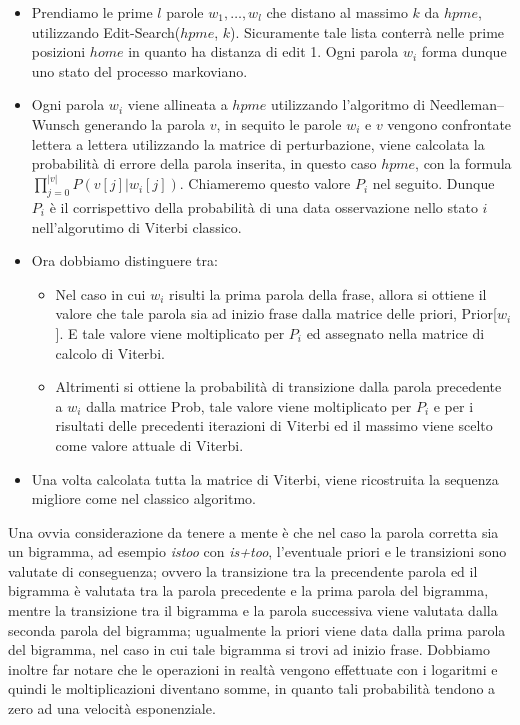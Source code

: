 \begin{itemize}
  \item Prendiamo le prime $l$ parole $w_1, \dots, w_l$ che distano al massimo $k$ da 
  $hpme$, utilizzando Edit-Search($hpme$, $k$). 
  Sicuramente tale lista conterr\`a nelle prime posizioni $home$ 
  in quanto ha distanza di edit 1. 
   Ogni parola $w_i$ forma dunque uno stato del processo markoviano.
  \item Ogni parola $w_i$ viene allineata a $hpme$ utilizzando 
  l'algoritmo di Needleman–Wunsch \cite{NEEDLEMAN1970443} generando
  la parola $v$, in sequito le parole $w_i$ e $v$ vengono confrontate
  lettera a lettera utilizzando la matrice di perturbazione, viene
  calcolata la probabilit\`a di errore della parola inserita, in 
  questo caso $hpme$, con la formula 
  $\prod_{j=0}^{|v|} P(v[j] \vert w_i[j])$. 
  Chiameremo questo valore $P_i$ nel seguito. 
  Dunque $P_i$ \`e il corrispettivo della probabilit\`a di una data
  osservazione nello stato $i$ nell'algorutimo di Viterbi classico.
  \item Ora dobbiamo distinguere tra:
  \begin{itemize}
    \item Nel caso in cui $w_i$ risulti la prima parola della frase,
    allora si ottiene il valore che tale parola sia ad inizio frase
    dalla matrice delle priori, Prior[$w_i$]. E tale valore viene
    moltiplicato per $P_i$ ed assegnato nella matrice di calcolo di
    Viterbi.
    \item Altrimenti si ottiene la probabilit\`a di transizione dalla
    parola precedente a $w_i$ dalla matrice Prob, tale valore viene
    moltiplicato per $P_i$ e per i risultati delle precedenti 
    iterazioni di Viterbi ed il massimo viene scelto come valore
    attuale di Viterbi.
  \end{itemize}
  \item Una volta calcolata tutta la matrice di Viterbi, viene 
  ricostruita la sequenza migliore come nel classico algoritmo.
\end{itemize}
Una ovvia considerazione da tenere a mente \`e che nel caso la parola
corretta sia un bigramma, ad esempio \textit{istoo} con 
\textit{is+too}, l'eventuale priori e le transizioni sono valutate
di conseguenza; ovvero la transizione tra la precendente parola ed
il bigramma \`e valutata tra la parola precedente e la prima parola
del bigramma, mentre la transizione tra il bigramma e la parola 
successiva viene valutata dalla seconda parola del bigramma; 
ugualmente la priori viene data dalla prima parola del bigramma,
nel caso in cui tale bigramma si trovi ad inizio frase. 
Dobbiamo inoltre far notare che le operazioni in realt\`a vengono effettuate
con i logaritmi e quindi le moltiplicazioni diventano somme, 
in quanto tali probabilit\`a tendono a zero ad una velocit\`a 
esponenziale.

